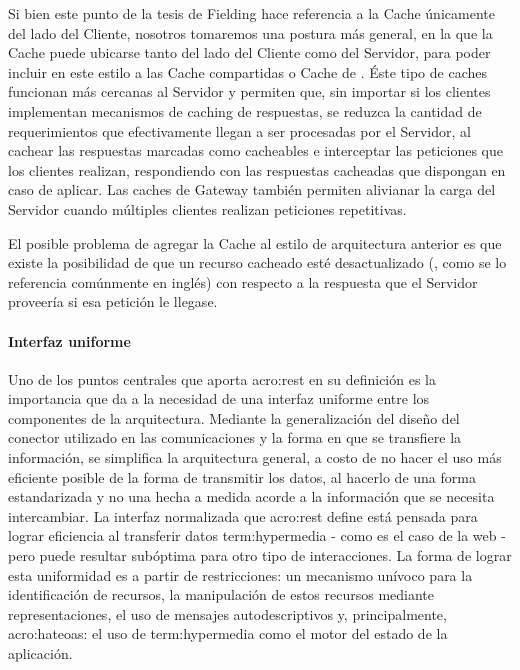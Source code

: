 Si bien este punto de la tesis de Fielding hace referencia a la Cache únicamente del lado del Cliente, nosotros tomaremos una postura más general, en la que la Cache puede ubicarse tanto del lado del Cliente como del Servidor, para poder incluir en este estilo a las Cache compartidas o Cache de . Éste tipo de caches funcionan más cercanas al Servidor y permiten que, sin importar si los clientes implementan mecanismos de caching de respuestas, se reduzca la cantidad de requerimientos que efectivamente llegan a ser procesadas por el Servidor, al cachear las respuestas marcadas como cacheables e interceptar las peticiones que los clientes realizan, respondiendo con las respuestas cacheadas que dispongan en caso de aplicar. Las caches de Gateway también permiten alivianar la carga del Servidor cuando múltiples clientes realizan peticiones repetitivas.

El posible problema de agregar la Cache al estilo de arquitectura anterior es que existe la posibilidad de que un recurso cacheado esté desactualizado (, como se lo referencia comúnmente en inglés) con respecto a la respuesta que el Servidor proveería si esa petición le llegase.


\paragraph{Interfaz uniforme}

Uno de los puntos centrales que aporta \gls{acro:rest} en su definición es la importancia que da a la necesidad de una interfaz uniforme entre los componentes de la arquitectura. Mediante la generalización del diseño del conector utilizado en las comunicaciones y la forma en que se transfiere la información, se simplifica la arquitectura general, a costo de no hacer el uso más eficiente posible de la forma de transmitir los datos, al hacerlo de una forma estandarizada y no una hecha a medida acorde a la información que se necesita intercambiar. La interfaz normalizada que \gls{acro:rest} define está pensada para lograr eficiencia al transferir datos \gls{term:hypermedia} - como es el caso de la web - pero puede resultar subóptima para otro tipo de interacciones. La forma de lograr esta uniformidad es a partir de restricciones: un mecanismo unívoco para la identificación de recursos, la manipulación de estos recursos mediante representaciones, el uso de mensajes autodescriptivos y, principalmente, \gls{acro:hateoas}: el uso de \gls{term:hypermedia} como el motor del estado de la aplicación.



